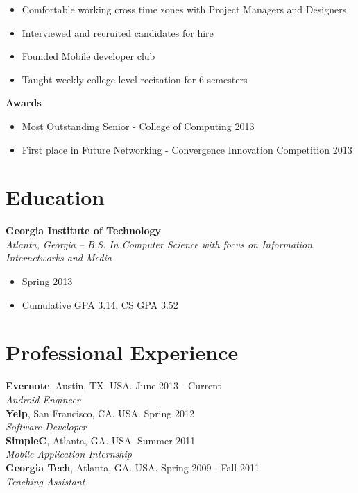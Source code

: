 \documentclass[margin,line]{res}
\begin{document}
\begin{resume}
\begin{itemize}
    \item Comfortable working cross time zones with Project Managers and Designers 
    \item Interviewed and recruited candidates for hire
    \item Founded Mobile developer club
    \item Taught weekly college level recitation for 6 semesters
    \end{itemize}
 {\bf Awards}
    \begin{itemize}
    \item Most Outstanding Senior - College of Computing 2013
    \item First place in Future Networking - Convergence Innovation Competition 2013
    \end{itemize}
\section{\sc Education}
    {\bf Georgia Institute of Technology}\\
    {\em Atlanta, Georgia -- B.S. In Computer Science with focus on
      Information Internetworks and Media}
    \begin{itemize}
    \item Spring 2013
    \item Cumulative GPA 3.14, CS GPA 3.52
    \end{itemize}

\section{\sc Professional Experience}
    {\bf Evernote}, Austin, TX. USA. \hfill{June 2013 - Current}\\
    {\em Android Engineer} \\
    {\bf Yelp}, San Francisco, CA. USA. \hfill{Spring 2012}\\
    {\em Software Developer}\hfill\\
    {\bf SimpleC}, Atlanta, GA. USA. \hfill{Summer 2011}\\
    {\em Mobile Application Internship} \\
    {\bf Georgia Tech}, Atlanta, GA. USA. \hfill{Spring 2009 - Fall 2011}\\
    {\em Teaching Assistant} \\

\end{resume}
\end{document}
